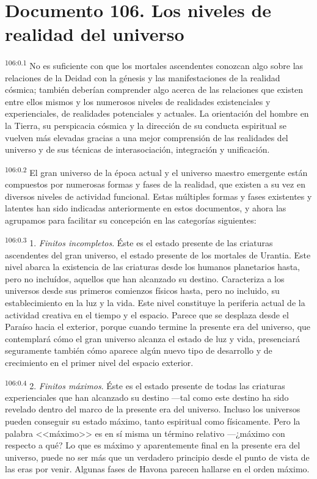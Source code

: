 \chapter{Documento 106. Los niveles de realidad del universo}
\par
\textsuperscript{106:0.1} No es suficiente con que los mortales ascendentes conozcan algo sobre las relaciones de la Deidad con la génesis y las manifestaciones de la realidad cósmica; también deberían comprender algo acerca de las relaciones que existen entre ellos mismos y los numerosos niveles de realidades existenciales y experienciales, de realidades potenciales y actuales. La orientación del hombre en la Tierra, su perspicacia cósmica y la dirección de su conducta espiritual se vuelven más elevadas gracias a una mejor comprensión de las realidades del universo y de sus técnicas de interasociación, integración y unificación.

\par
\textsuperscript{106:0.2} El gran universo de la época actual y el universo maestro emergente están compuestos por numerosas formas y fases de la realidad, que existen a su vez en diversos niveles de actividad funcional. Estas múltiples formas y fases existentes y latentes han sido indicadas anteriormente en estos documentos, y ahora las agrupamos para facilitar su concepción en las categorías siguientes:

\par
\textsuperscript{106:0.3} 1. \textit{Finitos incompletos}. Éste es el estado presente de las criaturas ascendentes del gran universo, el estado presente de los mortales de Urantia. Este nivel abarca la existencia de las criaturas desde los humanos planetarios hasta, pero no incluídos, aquellos que han alcanzado su destino. Caracteriza a los universos desde sus primeros comienzos físicos hasta, pero no incluido, su establecimiento en la luz y la vida. Este nivel constituye la periferia actual de la actividad creativa en el tiempo y el espacio. Parece que se desplaza desde el Paraíso hacia el exterior, porque cuando termine la presente era del universo, que contemplará cómo el gran universo alcanza el estado de luz y vida, presenciará seguramente también cómo aparece algún nuevo tipo de desarrollo y de crecimiento en el primer nivel del espacio exterior.

\par
\textsuperscript{106:0.4} 2. \textit{Finitos máximos}. Éste es el estado presente de todas las criaturas experienciales que han alcanzado su destino ---tal como este destino ha sido revelado dentro del marco de la presente era del universo. Incluso los universos pueden conseguir su estado máximo, tanto espiritual como físicamente. Pero la palabra <<máximo>> es en sí misma un término relativo ---¿máximo con respecto a qué? Lo que es máximo y aparentemente final en la presente era del universo, puede no ser más que un verdadero principio desde el punto de vista de las eras por venir. Algunas fases de Havona parecen hallarse en el orden máximo.

